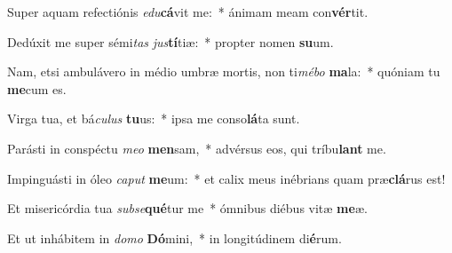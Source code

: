 \item Super aquam refectiónis \textit{e}\textit{du}\textbf{cá}vit me:~* ánimam meam con\textbf{vér}tit.
\item Dedúxit me super sémi\textit{tas} \textit{jus}\textbf{tí}tiæ:~* propter nomen \textbf{su}um.
\item Nam, etsi ambulávero in médio umbræ mortis, non ti\textit{mé}\textit{bo} \textbf{ma}la:~* quóniam tu \textbf{me}cum es.
\item Virga tua, et bá\textit{cu}\textit{lus} \textbf{tu}us:~* ipsa me conso\textbf{lá}ta sunt.
\item Parásti in conspéctu \textit{me}\textit{o} \textbf{men}sam,~* advérsus eos, qui tríbu\textbf{lant} me.
\item Impinguásti in óleo \textit{ca}\textit{put} \textbf{me}um:~* et calix meus inébrians quam præ\textbf{clá}rus est!
\item Et misericórdia tua \textit{sub}\textit{se}\textbf{qué}tur me~* ómnibus diébus vitæ \textbf{me}æ.
\item Et ut inhábitem in \textit{do}\textit{mo} \textbf{Dó}mini,~* in longitúdinem di\textbf{é}rum.
